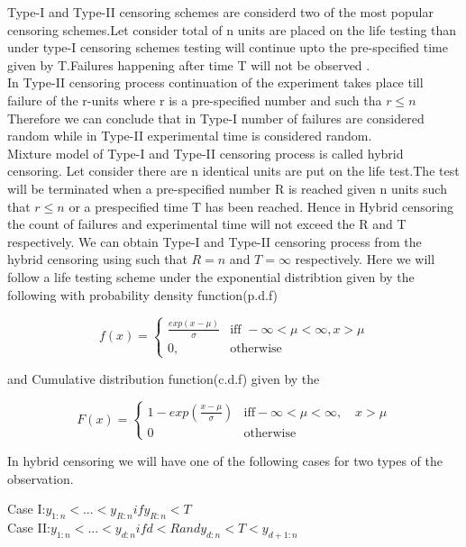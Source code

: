\documentclass[12pt]{article}
\begin{document}
Type-I and Type-II censoring schemes are considerd two of the most popular censoring schemes.Let consider total of n units are placed on the life testing than under type-I censoring schemes testing will continue upto the pre-specified time given by T.Failures happening after time T will not be observed .\\
In Type-II censoring process continuation of the experiment takes place till failure of the r-units where r is a pre-specified number and such tha $r\leq n$
Therefore we can conclude that in Type-I number of failures are considered random while in Type-II experimental time is considered random.\\
Mixture model of Type-I and Type-II censoring process is called hybrid censoring.
Let consider there are n identical units are put on the life test.The test will be terminated when a pre-specified number R is reached given n units such that $r \leq n$ or a prespecified time T has been reached. Hence in Hybrid censoring the count of failures and experimental time will not exceed the R and T respectively.
We can obtain Type-I and Type-II censoring process from the hybrid censoring using such that $R=n$ and $T=\infty$ respectively. 
 Here we will follow a life testing scheme under the exponential distribtion given by the following with probability density function(p.d.f)\\
 \begin{center}
 		\[
 		f(x)= 
 		\begin{cases}
 		\frac{exp(x-\mu)}{\sigma}      & \text{iff } -\infty<\mu<\infty,x>\mu\\
 		0,         & \text{otherwise} 
 		\end{cases}
 		\]
 	
 	\begin{flushleft}
 		and Cumulative distribution function(c.d.f) given by the 
 	\end{flushleft}
 	\[
 	F(x)=
 	\begin{cases}
 	1-exp({\frac{x-\mu}{\sigma}}) &\text{iff} -\infty<\mu<\infty,\quad x>\mu\\
 	0                             &\text{otherwise}
 	\end{cases}
 	\]
 \end{center}
 
 In hybrid censoring we will have one of the following cases for two types of the observation.
 \begin{center}
 	Case I:${y_{1:n} < ... < y_{R:n}} if y_{R:n} < T $\\
 	Case II:${y_{1:n} < ... <y_{d:n}} if d<R and y_{d:n} < T < y_{d+1:n}$
 \end{center}
 
\end{document}
